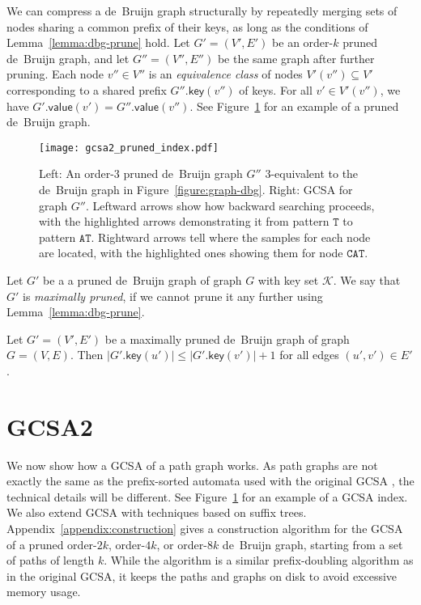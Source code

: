\documentclass[a4paper,UKenglish]{lipics-v2016}
\newcommand{\abs}[1]{\ensuremath{\lvert #1 \rvert}}
\newcommand{\dnaseq}[1]{\ensuremath{\mathtt{#1}}}
\newcommand{\gkey}{\ensuremath{\mathsf{key}}}
\newcommand{\gvalue}{\ensuremath{\mathsf{value}}}
\newcommand{\kequivalent}[1]{$#1$\nobreakdash-equivalent}
\newcommand{\orderk}[1]{order\nobreakdash-$#1$}
\begin{document}
We can compress a de~Bruijn graph structurally by repeatedly merging sets of nodes sharing a common prefix of their keys, as long as the conditions of Lemma~\ref{lemma:dbg-prune} hold. Let $G' = (V', E')$ be an \orderk{k} pruned de~Bruijn graph, and let $G'' = (V'', E'')$ be the same graph after further pruning. Each node $v'' \in V''$ is an \emph{equivalence class} of nodes $V'(v'') \subseteq V'$ corresponding to a shared prefix $G''.\gkey(v'')$ of keys. For all $v' \in V'(v'')$, we have $G'.\gvalue(v') = G''.\gvalue(v'')$. See Figure~\ref{figure:pruned-index} for an example of a pruned de~Bruijn graph.

\begin{figure}[t!]
\texttt{[image: gcsa2\_pruned\_index.pdf]}
\caption{Left: An \orderk{3} pruned de~Bruijn graph $G''$ \kequivalent{3} to the de~Bruijn graph in Figure~\ref{figure:graph-dbg}. Right: GCSA for graph $G''$. Leftward arrows show how backward searching proceeds, with the highlighted arrows demonstrating it from pattern $\dnaseq{T}$ to pattern $\dnaseq{AT}$. Rightward arrows tell where the samples for each node are located, with the highlighted ones showing them for node $\dnaseq{CAT}$.}\label{figure:pruned-index}
\end{figure}

\begin{definition}
Let $G'$ be a a pruned de~Bruijn graph of graph $G$ with key set $\mathcal{K}$. We say that $G'$ is \emph{maximally pruned}, if we cannot prune it any further using Lemma~\ref{lemma:dbg-prune}.
\end{definition}

\begin{lemma}\label{lemma:dbg-maximal}
Let $G' = (V', E')$ be a maximally pruned de~Bruijn graph of graph $G = (V, E)$. Then $\abs{G'.\gkey(u')} \le \abs{G'.\gkey(v')}+1$ for all edges $(u', v') \in E'$.
\end{lemma}


\section{GCSA2}

We now show how a GCSA of a path graph works. As path graphs are not exactly the same as the prefix-sorted automata used with the original GCSA \cite{Siren2014}, the technical details will be different.
See Figure~\ref{figure:pruned-index} for an example of a GCSA index.
We also extend GCSA with techniques based on suffix trees.
Appendix~\ref{appendix:construction} gives a construction algorithm for the GCSA of a pruned \orderk{2k}, \orderk{4k}, or \orderk{8k} de~Bruijn graph, starting from a set of paths of length $k$. While the algorithm is a similar prefix-doubling algorithm as in the original GCSA, it keeps the paths and graphs on disk to avoid excessive memory usage.
\end{document}
